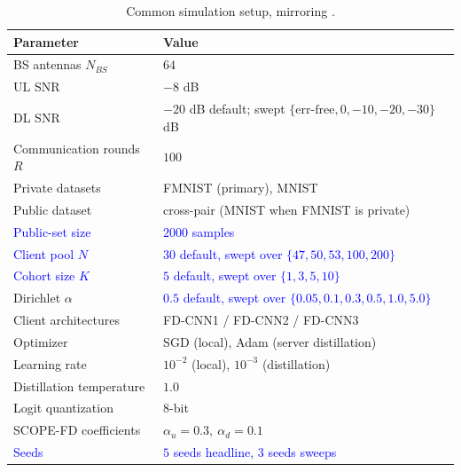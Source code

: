 \documentclass[journal]{IEEEtran}
\newcommand{\rev}[1]{\textcolor{blue}{#1}}
\begin{document}
\begin{table}[t]
\centering
\caption{Common simulation setup, mirroring \cite{mu2024fedtskd}.}
\label{tab:setup}
\renewcommand{\arraystretch}{1.25}
\footnotesize
\setlength{\tabcolsep}{4pt}
\begin{tabular}{@{}>{\raggedright\arraybackslash}m{}>{\raggedright\arraybackslash}m{}@{}}
\toprule
\textbf{Parameter} & \textbf{Value} \\
\midrule
BS antennas $N_{BS}$ & $64$ \\
UL SNR & $-8$ dB \\
DL SNR & $-20$ dB default; swept $\{\text{err-free}, 0, -10, -20, -30\}$ dB \\
Communication rounds $R$ & $100$ \\
Private datasets & FMNIST (primary), MNIST \\
Public dataset & cross-pair (MNIST when FMNIST is private) \\
\rev{Public-set size} & \rev{$2000$ samples} \\
\rev{Client pool $N$} & \rev{$30$ default, swept over $\{47,50,53,100,200\}$} \\
\rev{Cohort size $K$} & \rev{$5$ default, swept over $\{1,3,5,10\}$} \\
Dirichlet $\alpha$ & \rev{$0.5$ default, swept over $\{0.05,0.1,0.3,0.5,1.0,5.0\}$} \\
Client architectures & FD-CNN1 / FD-CNN2 / FD-CNN3 \\
Optimizer & SGD (local), Adam (server distillation) \\
Learning rate & $10^{-2}$ (local), $10^{-3}$ (distillation) \\
Distillation temperature & $1.0$ \\
Logit quantization & $8$-bit \\
SCOPE-FD coefficients & $\alpha_u = 0.3,\ \alpha_d = 0.1$ \\
\rev{Seeds} & \rev{$5$ seeds headline, $3$ seeds sweeps} \\
\bottomrule
\end{tabular}
\end{table}
\end{document}
